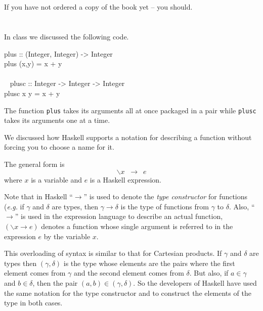 \documentclass[11pt]{article}
\begin{document}

\section{}


If you have not ordered a copy of the book yet -- you
should.  

\section{}
In class we discussed the following code.

\begin{program*}

\> plus :: (Integer, Integer) -> Integer \\
\> plus (x,y) = x + y \\
\>   \\\
\> plusc :: Integer -> Integer -> Integer \\
\> plusc x y = x + y \\
\end{program*}


The function {\tt{plus}} takes its arguments all at once packaged in a pair
while {\tt{plusc}} takes its arguments one at a time.

We discussed how Haskell supports a notation for describing a function without
forcing you to choose a name for it.

The general form is 
\[ \backslash x \;\;\rightarrow\:\; e \]
where $x$ is a variable and $e$ is a Haskell expression.

Note that in Haskell ``$\rightarrow$'' is used to denote the {\em{type
constructor}} for functions ({\em{e.g.}} if $\gamma$ and $\delta$ are types,
then $\gamma \rightarrow \delta$ is the type of functions from $\gamma$ to
$\delta$.  Also, ``$\rightarrow$'' is used in the expression language to
describe an actual function, $(\backslash x \rightarrow e)$ denotes a function
whose single argument is referred to in the expression $e$ by the variable $x$.

This overloading of syntax is similar to that for Cartesian products.  If
$\gamma$ and $\delta$ are types then $(\gamma,\delta)$ is the type whose
elements are the pairs where the first element comes from $\gamma$ and the
second element comes from $\delta$. But also, if $a\in\gamma$ and $b\in\delta$,
then the pair $(a,b)\in(\gamma,\delta)$.  So the developers of Haskell have
used the same notation for the type constructor and to construct the elements
of the type in both cases.
\end{document}
